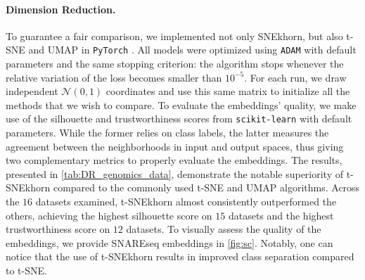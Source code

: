 \paragraph{Dimension Reduction.}
To guarantee a fair comparison, we implemented not only SNEkhorn, but also t-SNE and UMAP in \texttt{PyTorch} \cite{paszke2017automatic}. 
All models were optimized using \texttt{ADAM} \cite{kingma2014adam} with default parameters and the same stopping criterion: the algorithm stops whenever the relative variation of the loss becomes smaller than $10^{-5}$. For each run, we draw independent $\mathcal{N}(0,1)$ coordinates and use this same matrix to initialize all the methods that we wish to compare. To evaluate the embeddings' quality, we make use of the silhouette \cite{rousseeuw1987silhouettes} and trustworthiness \cite{venna2001neighborhood} scores from \texttt{scikit-learn} \cite{scikit-learn} with default parameters.  While the former relies on class labels, the latter measures the agreement between the neighborhoods in input and output spaces, thus giving two complementary metrics to properly evaluate the embeddings. 
The results, presented in \cref{tab:DR_genomics_data}, demonstrate the notable superiority of t-SNEkhorn compared to the commonly used t-SNE and UMAP algorithms. Across the $16$ datasets examined, t-SNEkhorn almost consistently outperformed the others, achieving the highest silhouette score on $15$ datasets and the highest trustworthiness score on $12$ datasets. To visually assess the quality of the embeddings, we provide SNAREseq embeddings in \cref{fig:sc}. Notably, one can notice that the use of t-SNEkhorn results in improved class separation compared to t-SNE.
 
